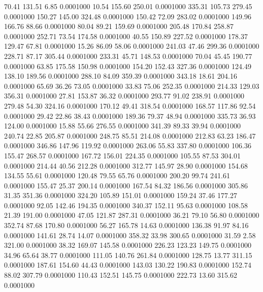   70.41  131.51    6.85   0.0001000
  10.54  155.60  250.01   0.0001000
 335.31  105.73  279.45   0.0001000
 150.27  145.00  324.48   0.0001000
 150.42   72.09  283.02   0.0001000
 149.96  166.76   88.66   0.0001000
  80.04   89.21  159.69   0.0001000
 205.48  170.84  258.87   0.0001000
 252.71   73.54  174.58   0.0001000
  40.55  150.89  227.52   0.0001000
 178.37  129.47   67.81   0.0001000
  15.26   86.09   58.06   0.0001000
 241.03   47.46  299.36   0.0001000
 228.71   87.17  305.44   0.0001000
 233.31   45.71  148.53   0.0001000
  70.04   45.45  190.77   0.0001000
  63.85  175.58  150.98   0.0001000
 154.20  152.43  327.36   0.0001000
 124.49  138.10  189.56   0.0001000
 288.10   84.09  359.39   0.0001000
 343.18   18.61  204.16   0.0001000
  65.69   36.26   73.05   0.0001000
  33.83   75.06  252.35   0.0001000
 214.33  129.03  356.31   0.0001000
  27.81  153.87   36.32   0.0001000
 293.77   91.02  238.91   0.0001000
 279.48   54.30  324.16   0.0001000
 170.12   49.41  318.54   0.0001000
 168.57  117.86   92.54   0.0001000
  29.42   22.86   38.43   0.0001000
 189.36   79.37   48.94   0.0001000
 335.73   36.93  124.00   0.0001000
  15.88   55.66  276.55   0.0001000
 341.39   89.33   39.94   0.0001000
 240.74   22.85  205.87   0.0001000
 248.75   85.51  214.08   0.0001000
 212.83   63.23  186.47   0.0001000
 346.86  147.96  119.92   0.0001000
 263.06   55.83  337.80   0.0001000
 106.36  155.47  268.57   0.0001000
 167.72  156.01  224.35   0.0001000
 105.55   87.53  304.01   0.0001000
 214.44   40.56  212.28   0.0001000
 312.77  145.97   28.90   0.0001000
 154.68  134.55   55.61   0.0001000
 120.48   79.55   65.76   0.0001000
 200.20   99.74  241.61   0.0001000
 155.47   25.37  200.14   0.0001000
 167.54   84.32  186.56   0.0001000
 305.86   31.35  351.36   0.0001000
 324.20  105.89  151.01   0.0001000
 159.24   37.46  177.27   0.0001000
  92.05  142.46  194.35   0.0001000
 340.37  152.11   95.63   0.0001000
 108.58   21.39  191.00   0.0001000
  47.05  121.87  287.31   0.0001000
  36.21   79.10   56.80   0.0001000
 352.74   87.68  170.80   0.0001000
  56.27  165.78   14.63   0.0001000
 136.38   91.97   84.16   0.0001000
 141.61   28.74   14.07   0.0001000
 358.32   33.98  300.65   0.0001000
  31.59    2.58  321.00   0.0001000
  38.32  169.07  145.58   0.0001000
 226.23  123.23  149.75   0.0001000
  34.96   65.64   38.77   0.0001000
 111.05  140.76  261.84   0.0001000
 128.75   13.77  311.15   0.0001000
 187.61  154.60   44.43   0.0001000
 143.03  130.22  190.83   0.0001000
 152.74   88.02  307.79   0.0001000
 110.43  152.51  145.75   0.0001000
 222.73   13.60  315.62   0.0001000
